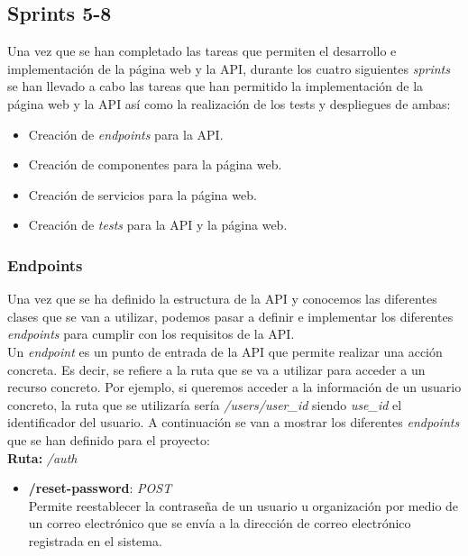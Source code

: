 \subsection{Sprints 5-8}\label{subsec:sprints-5-8}

Una vez que se han completado las tareas que permiten el desarrollo e implementación de la página web y la API, durante los
cuatro siguientes \textit{sprints} se han llevado a cabo las tareas que han permitido la implementación de la página web y la API
así como la realización de los tests y despliegues de ambas:

\begin{itemize}
    \item Creación de \textit{endpoints} para la API.
    \item Creación de componentes para la página web.
    \item Creación de servicios para la página web.
    \item Creación de \textit{tests} para la API y la página web.
\end{itemize}

\subsubsection{Endpoints}\label{subsubsec:endpoints}

Una vez que se ha definido la estructura de la API y conocemos las diferentes clases que se van a utilizar, podemos
pasar a definir e implementar los diferentes \textit{endpoints} para cumplir con los requisitos de la API.\\

Un \textit{endpoint} es un punto de entrada de la API que permite realizar una acción concreta. Es decir,
se refiere a la ruta que se va a utilizar para acceder a un recurso concreto. Por ejemplo, si queremos acceder a la
información de un usuario concreto, la ruta que se utilizaría sería \textit{/users/{user\_id}} siendo \textit{use\_id}
el identificador del usuario. A continuación se van a mostrar los diferentes \textit{endpoints} que se han definido para
el proyecto: \\

\textbf{Ruta:} \textit{/auth}

\begin{itemize}
    \item \textbf{/reset-password}: \textit{POST} \\
    Permite reestablecer la contraseña de un usuario u organización por medio de un correo electrónico que se envía
    a la dirección de correo electrónico registrada en el sistema.
\end{itemize}

